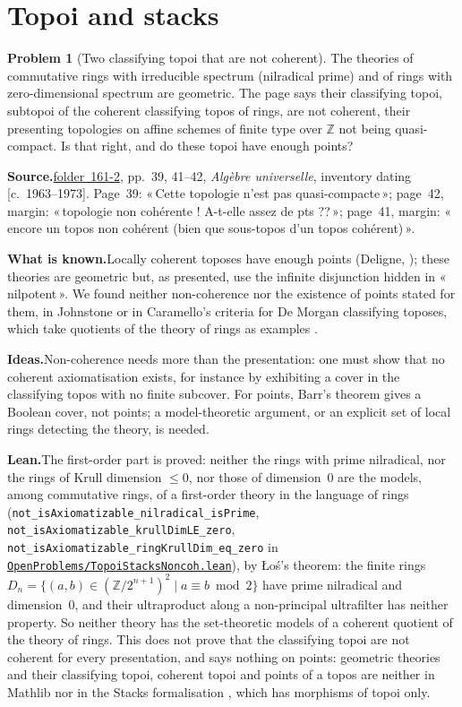 \documentclass[11pt]{article}
\newcommand{\q}[1]{«\,#1\,»}
\newcommand{\fac}[1]{\href{https://grothendieck.umontpellier.fr/#1.pdf}{folder~#1}}
\theoremstyle{definition}
\newtheorem{problem}{Problem}
\theoremstyle{plain}\newtheorem*{proposition}{Proposition}\theoremstyle{definition}
\newcommand{\entry}[1]{\par\medskip\noindent\textbf{#1}\enspace}
\newcommand{\src}[1]{\entry{Source.}#1}
\newcommand{\known}{\entry{What is known.}}
\newcommand{\ideas}{\entry{Ideas.}}
\newcommand{\leanst}{\entry{Lean.}}
\newcommand{\leanop}[1]{\href{https://github.com/Commutator-IO/GrothendieckArchivesProofs/blob/main/OpenProblems/#1.lean}{\nolinkurl{OpenProblems/#1.lean}}}
\begin{document}
\section{Topoi and stacks}

\begin{problem}[Two classifying topoi that are not coherent]\label{p:noncoh}
The theories of commutative rings with irreducible spectrum (nilradical prime) and of rings with zero-dimensional spectrum are geometric. The page says their classifying topoi, subtopoi of the coherent classifying topos of rings, are not coherent, their presenting topologies on affine schemes of finite type over $\mathbb Z$ not being quasi-compact. Is that right, and do these topoi have enough points?
\end{problem}

\src{\fac{161-2}, pp.~39, 41--42, \emph{Algèbre universelle}, inventory dating [c.~1963--1973]. Page~39: \q{Cette topologie n'est pas quasi-compacte}; page~42, margin: \q{topologie non cohérente ! A-t-elle assez de pts ??}; page~41, margin: \q{encore un topos non cohérent (bien que sous-topos d'un topos cohérent)}.}

\known Locally coherent toposes have enough points (Deligne, \cite[VI, 9.0]{sga4}); these theories are geometric but, as presented, use the infinite disjunction hidden in \q{nilpotent}. We found neither non-coherence nor the existence of points stated for them, in Johnstone \cite{elephant} or in Caramello's criteria for De Morgan classifying toposes, which take quotients of the theory of rings as examples \cite[\S5]{caramello}.

\ideas Non-coherence needs more than the presentation: one must show that no coherent axiomatisation exists, for instance by exhibiting a cover in the classifying topos with no finite subcover. For points, Barr's theorem gives a Boolean cover, not points; a model-theoretic argument, or an explicit set of local rings detecting the theory, is needed.

\leanst The first-order part is proved: neither the rings with prime nilradical, nor the rings of Krull dimension $\leq 0$, nor those of dimension~$0$ are the models, among commutative rings, of a first-order theory in the language of rings (\texttt{not\_isAxiomatizable\_nilradical\_isPrime}, \texttt{not\_isAxiomatizable\_krullDimLE\_zero}, \texttt{not\_isAxiomatizable\_ringKrullDim\_eq\_zero} in \leanop{TopoiStacksNoncoh}), by Łoś's theorem: the finite rings $D_n = \{(a, b) \in (\mathbb Z/2^{n+1})^2 \mid a \equiv b \bmod 2\}$ have prime nilradical and dimension~$0$, and their ultraproduct along a non-principal ultrafilter has neither property. So neither theory has the set-theoretic models of a coherent quotient of the theory of rings. This does not prove that the classifying topoi are not coherent for every presentation, and says nothing on points: geometric theories and their classifying topoi, coherent topoi and points of a topos are neither in Mathlib nor in the Stacks formalisation \cite{axiomstacks}, which has morphisms of topoi only.
\end{document}
